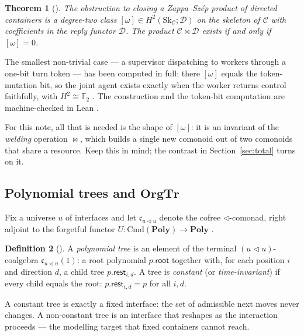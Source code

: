 \documentclass[11pt]{amsart}
\newtheorem{theorem}{Theorem}[section]
\theoremstyle{definition}
\newtheorem{definition}[theorem]{Definition}
\theoremstyle{remark}
\newcommand{\Poly}{\mathbf{Poly}}
\newcommand{\OrgTr}{\mathbf{OrgTr}}
\newcommand{\C}{\mathcal{C}}
\newcommand{\D}{\mathcal{D}}
\newcommand{\Sk}{\mathrm{Sk}}
\newcommand{\dir}{\mathcal{D}}
\newcommand{\seq}{\triangleleft}
\newcommand{\zs}{\bowtie}
\newcommand{\cofree}{\mathfrak{c}}
\begin{document}
\begin{theorem}[\cite{gobstr}]\label{thm:omega}
The obstruction to closing a Zappa--Szép product of directed containers is a degree-two
class $[\omega]\in H^2(\Sk_\C;\dir)$ on the skeleton of $\C$ with coefficients in the reply
functor $\dir$. The product $\C\zs\D$ exists if and only if $[\omega]=0$.
\end{theorem}

The smallest non-trivial case --- a supervisor dispatching to workers through a one-bit
turn token --- has been computed in full: there $[\omega]$ equals the token-mutation bit,
so the joint agent exists exactly when the worker returns control faithfully, with
$H^2\cong\mathbb{F}_2$ \cite{analytic}. The construction and the token-bit computation are
machine-checked in Lean \cite{leanreentrancy}.

For this note, all that is needed is the shape of $[\omega]$: it is an invariant of the
\emph{welding} operation $\zs$, which builds a single new comonoid out of two comonoids that
share a resource. Keep this in mind; the contrast in Section~\ref{sec:total} turns on it.

\subsection{Polynomial trees and \texorpdfstring{$\OrgTr$}{OrgTr}}
Fix a universe $u$ of interfaces and let $\cofree_{u\seq u}$ denote the cofree $\seq$-comonad,
right adjoint to the forgetful functor $U\colon\mathrm{Cmd}(\Poly)\to\Poly$
\cite[Prop.~2.2]{SpivakOrgTr}.

\begin{definition}[{\cite[Def.~3.1]{SpivakOrgTr}}]\label{def:tree}
A \emph{polynomial tree} is an element of the terminal $(u\seq u)$-coalgebra
$\cofree_{u\seq u}(1)$: a root polynomial $p.\mathsf{root}$ together with, for each
position $i$ and direction $d$, a child tree $p.\mathsf{rest}_{i,d}$. A tree is
\emph{constant} (or \emph{time-invariant}) if every child equals the root:
$p.\mathsf{rest}_{i,d}=p$ for all $i,d$.
\end{definition}

A constant tree is exactly a fixed interface: the set of admissible next moves never
changes. A non-constant tree is an interface that reshapes as the interaction proceeds ---
the modelling target that fixed containers cannot reach.
\end{document}
